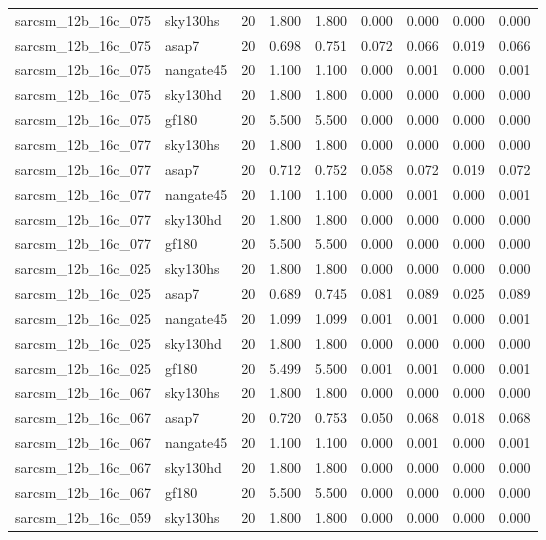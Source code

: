 \begin{tabular}{llrrrrrrr}
sarcsm\_12b\_16c\_075 & sky130hs & 20 & 1.800 & 1.800 & 0.000 & 0.000 & 0.000 & 0.000 \\
sarcsm\_12b\_16c\_075 & asap7 & 20 & 0.698 & 0.751 & 0.072 & 0.066 & 0.019 & 0.066 \\
sarcsm\_12b\_16c\_075 & nangate45 & 20 & 1.100 & 1.100 & 0.000 & 0.001 & 0.000 & 0.001 \\
sarcsm\_12b\_16c\_075 & sky130hd & 20 & 1.800 & 1.800 & 0.000 & 0.000 & 0.000 & 0.000 \\
sarcsm\_12b\_16c\_075 & gf180 & 20 & 5.500 & 5.500 & 0.000 & 0.000 & 0.000 & 0.000 \\
sarcsm\_12b\_16c\_077 & sky130hs & 20 & 1.800 & 1.800 & 0.000 & 0.000 & 0.000 & 0.000 \\
sarcsm\_12b\_16c\_077 & asap7 & 20 & 0.712 & 0.752 & 0.058 & 0.072 & 0.019 & 0.072 \\
sarcsm\_12b\_16c\_077 & nangate45 & 20 & 1.100 & 1.100 & 0.000 & 0.001 & 0.000 & 0.001 \\
sarcsm\_12b\_16c\_077 & sky130hd & 20 & 1.800 & 1.800 & 0.000 & 0.000 & 0.000 & 0.000 \\
sarcsm\_12b\_16c\_077 & gf180 & 20 & 5.500 & 5.500 & 0.000 & 0.000 & 0.000 & 0.000 \\
sarcsm\_12b\_16c\_025 & sky130hs & 20 & 1.800 & 1.800 & 0.000 & 0.000 & 0.000 & 0.000 \\
sarcsm\_12b\_16c\_025 & asap7 & 20 & 0.689 & 0.745 & 0.081 & 0.089 & 0.025 & 0.089 \\
sarcsm\_12b\_16c\_025 & nangate45 & 20 & 1.099 & 1.099 & 0.001 & 0.001 & 0.000 & 0.001 \\
sarcsm\_12b\_16c\_025 & sky130hd & 20 & 1.800 & 1.800 & 0.000 & 0.000 & 0.000 & 0.000 \\
sarcsm\_12b\_16c\_025 & gf180 & 20 & 5.499 & 5.500 & 0.001 & 0.001 & 0.000 & 0.001 \\
sarcsm\_12b\_16c\_067 & sky130hs & 20 & 1.800 & 1.800 & 0.000 & 0.000 & 0.000 & 0.000 \\
sarcsm\_12b\_16c\_067 & asap7 & 20 & 0.720 & 0.753 & 0.050 & 0.068 & 0.018 & 0.068 \\
sarcsm\_12b\_16c\_067 & nangate45 & 20 & 1.100 & 1.100 & 0.000 & 0.001 & 0.000 & 0.001 \\
sarcsm\_12b\_16c\_067 & sky130hd & 20 & 1.800 & 1.800 & 0.000 & 0.000 & 0.000 & 0.000 \\
sarcsm\_12b\_16c\_067 & gf180 & 20 & 5.500 & 5.500 & 0.000 & 0.000 & 0.000 & 0.000 \\
sarcsm\_12b\_16c\_059 & sky130hs & 20 & 1.800 & 1.800 & 0.000 & 0.000 & 0.000 & 0.000 \\

\end{tabular}
